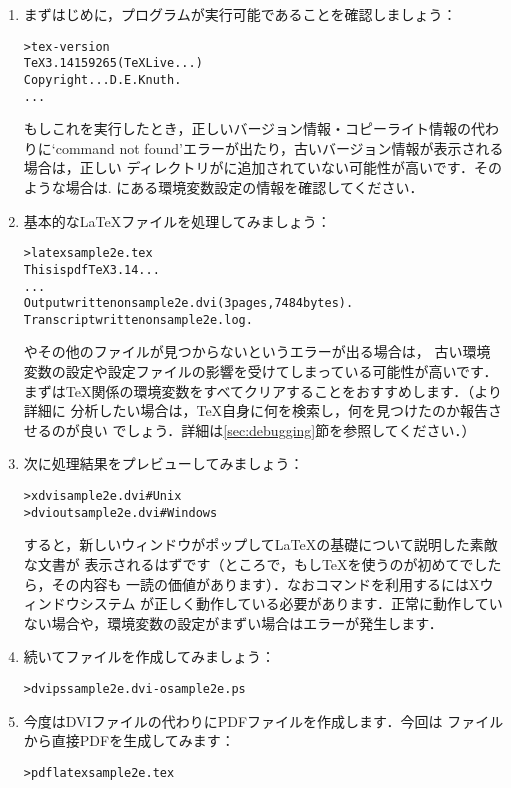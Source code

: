 \documentclass[uplatex,dvipdfmx,tombow]{jsarticle}
\begin{document}
\begin{enumerate}
\item まずはじめに，プログラムが実行可能であることを確認しましょう：
%
\begin{alltt}
> tex -version
TeX 3.14159265 (TeX Live ...)
Copyright ... D.E. Knuth.
...
\end{alltt}
%
もしこれを実行したとき，正しいバージョン情報・コピーライト情報の代わりに`command
not found'エラーが出たり，古いバージョン情報が表示される場合は，正しい%
ディレクトリがに追加されていない可能性が高いです．そのような場合は\p.%
\pageref{sec:env}にある環境変数設定の情報を確認してください．

\item 基本的な\LaTeX ファイルを処理してみましょう：
%
\begin{alltt}
> latex sample2e.tex
This is pdfTeX 3.14...
...
Output written on sample2e.dvi (3 pages, 7484 bytes).
Transcript written on sample2e.log.
\end{alltt}
%
やその他のファイルが見つからないというエラーが出る場合は，
古い環境変数の設定や設定ファイルの影響を受けてしまっている可能性が高いです．
まずは\TeX 関係の環境変数をすべてクリアすることをおすすめします．（より詳細に
分析したい場合は，\TeX 自身に何を検索し，何を見つけたのか報告させるのが良い
でしょう．詳細は\ref{sec:debugging}節を参照してください．）

\item 次に処理結果をプレビューしてみましょう：
%
\begin{alltt}
> xdvi sample2e.dvi    # Unix
> dviout sample2e.dvi  # Windows
\end{alltt}
%
すると，新しいウィンドウがポップして\LaTeX の基礎について説明した素敵な文書が
表示されるはずです（ところで，もし\TeX を使うのが初めてでしたら，その内容も
一読の価値があります）．なおコマンドを利用するにはXウィンドウシステム
が正しく動作している必要があります．正常に動作していない場合や，環境変数の設定がまずい場合はエラーが発生します．

\item 続いて\PS ファイルを作成してみましょう：
%
\begin{alltt}
> dvips sample2e.dvi -o sample2e.ps
\end{alltt}

\item 今度はDVIファイルの代わりにPDFファイルを作成します．今回は%
ファイルから直接PDFを生成してみます：
%
\begin{alltt}
> pdflatex sample2e.tex
\end{alltt}


\end{enumerate}
\end{document}
